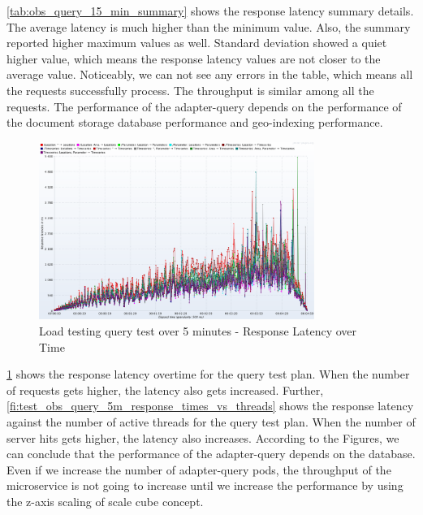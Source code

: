 \cref{tab:obs_query_15_min_summary} shows the response latency summary details. The average latency is much higher than the minimum value. Also, the summary reported higher maximum values as well. Standard deviation showed a quiet higher value, which means the response latency values are not closer to the average value. Noticeably, we can not see any errors in the table, which means all the requests successfully process. The throughput is similar among all the requests. The performance of the adapter-query depends on the performance of the document storage database performance and geo-indexing performance.

\begin{figure}[htp]
    \centering
    \includegraphics[width=0.8\textwidth]{results/obs/query/obs_query_5m_latency_over_time.png}
    \caption{Load testing query test over 5 minutes - Response Latency over Time}
    \label{fi:test_obs_query_5m_response_latency}
\end{figure}
\cref{fi:test_obs_query_5m_response_latency} shows the response latency overtime for the query test plan. When the number of requests gets higher, the latency also gets increased. Further, \cref{fi:test_obs_query_5m_response_times_vs_threads} shows the response latency against the number of active threads for the query test plan. When the number of server hits gets higher, the latency also increases. According to the Figures, we can conclude that the performance of the adapter-query depends on the database. Even if we increase the number of adapter-query pods, the throughput of the microservice is not going to increase until we increase the performance by using the z-axis scaling of scale cube concept.

